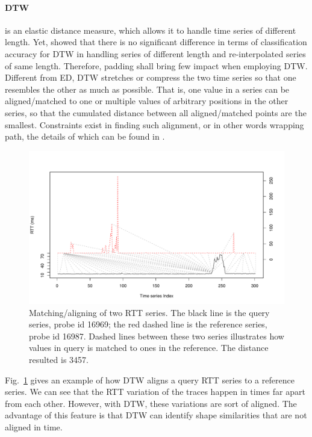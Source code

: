 \paragraph*{\ac{DTW}} is an elastic distance measure, which allows it to handle time series of different length. Yet, \cite{Ratanamahatana2005} showed that there is no significant difference in terms of classification accuracy for \ac{DTW} in handling series of different length and re-interpolated series of same length. 
Therefore, padding shall bring few impact when employing \ac{DTW}.
Different from ED, \ac{DTW} stretches or compress the two time series so that one resembles the other as much as possible. That is, one value in a series can be aligned/matched to one or multiple values of arbitrary positions in the other series, so that the cumulated distance between all aligned/matched points are the smallest. Constraints exist in finding such alignment, or in other words wrapping path, the details of which can be found in \cite{Sakoe1978, Keogh2005, Giorgino2009}.

\begin{figure}[!htb]
\centering
\includegraphics[width=.8\textwidth]{gfx/chap3/dtw_ex.pdf}
\caption{Matching/aligning of two RTT series. The black line is the query series, probe id 16969; the red dashed line is the reference series, probe id 16987. Dashed lines between these two series illustrates how values in query is matched to ones in the reference. The distance resulted is 3457.}
\label{fig:dtw_ex}
\end{figure}

Fig.~\ref{fig:dtw_ex} gives an example of how \ac{DTW} aligns a query RTT series to a reference series. We can see that the RTT variation of the traces happen in times far apart from each other. However, with \ac{DTW}, these variations are sort of aligned. The advantage of this feature is that \ac{DTW} can identify shape similarities that are not aligned in time.

